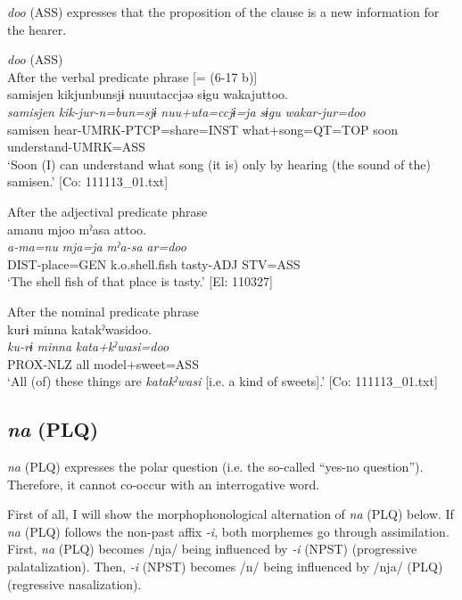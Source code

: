 \begin{xlist}
\textit{doo} (ASS) expresses that the proposition of the clause is a new information for the hearer.

\ea\label{ex:10.40}   \textit{doo} (ASS)\\
  \ea After the verbal predicate phrase [= (6-17 b)]\\
      \glll    samisjen  kikjunbunsjɨ  nuuutaccjəə  sɨgu  wakajuttoo.\\
    \textit{samisjen}  \textit{kik-jur-n=bun=sjɨ}  \textit{nuu+uta=ccjɨ=ja}  \textit{sɨgu}  \textit{wakar-jur=doo}\\
    samisen  hear-UMRK-PTCP=share=INST  what+song=QT=TOP  soon  understand-UMRK=ASS\\
\glt     ‘Soon (I) can understand what song (it is) only by hearing (the sound of the) samisen.’  [Co: 111113\_01.txt]

  \ex After the adjectival predicate phrase\\
      \glll    amanu  mjoo  mˀasa  attoo.\\
    \textit{a-ma=nu}  \textit{mja=ja}  \textit{mˀa-sa}  \textit{ar=doo}\\
    DIST-place=GEN  k.o.shell.fish  tasty-ADJ  STV=ASS\\
    \glt     ‘The shell fish of that place is tasty.’ [El: 110327]

  \ex  After the nominal predicate phrase\\
      \glll    kurɨ  minna  katakˀwasidoo.\\
    \textit{ku-rɨ}  \textit{minna}  \textit{kata+kˀwasi=doo}\\
    PROX-NLZ  all  model+sweet=ASS\\
\glt     ‘All (of) these things are \textit{katakˀwasi} [i.e. a kind of sweets].’  [Co: 111113\_01.txt]
    \z
\z

\subsection{\textit{na} (PLQ)}\label{sec:10.3.2}

\textit{na} (PLQ) expresses the polar question (i.e. the so-called “yes-no question”). Therefore, it cannot co-occur with an interrogative word.

First of all, I will show the morphophonological alternation of \textit{na} (PLQ) below. If \textit{na} (PLQ) follows the non-past affix \textit{{}-i}, both morphemes go through assimilation. First, \textit{na} (PLQ) becomes /nja/ being influenced by \textit{{}-i} (NPST) (progressive palatalization). Then, \textit{{}-i} (NPST) becomes /n/ being influenced by /nja/ (PLQ) (regressive nasalization).


\end{xlist}
